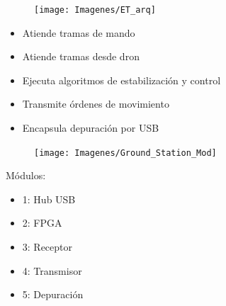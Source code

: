 \documentclass[a4,landscpae]{seminar}
\begin{document}
\begin{hslide}
\begin{minipage}{3cm}
	\begin{center}
		\begin{figure}
			\texttt{[image: Imagenes/ET\_arq]}
		\end{figure}
	\end{center}
\end{minipage} \vfill
\begin{minipage}{20cm}
	\begin{minipage}{5.8cm}
		\begin{itemize}
			\item Atiende tramas de mando
			\item Atiende tramas desde dron
			\item Ejecuta algoritmos de estabilizaci\'on y control
		\end{itemize}
	\end{minipage}
	\begin{minipage}{6cm}
		\begin{itemize}
			\item Transmite \'ordenes de movimiento
			\item Encapsula depuraci\'on por USB
		\end{itemize}
	\end{minipage}
\end{minipage} \vfill
\end{hslide}
\begin{hslide}
\begin{minipage}{3cm}
	\begin{center}
		\begin{figure}
			\texttt{[image: Imagenes/Ground\_Station\_Mod]}
		\end{figure}
	\end{center}
\end{minipage} \hfill
\begin{minipage}{2.8cm}
	M\'odulos:
	\begin{itemize}
		\item 1: Hub USB
		\item 2: FPGA
		\item 3: Receptor
		\item 4: Transmisor
		\item 5: Depuraci\'on
	\end{itemize}
\end{minipage}
\end{hslide}
\end{document}
